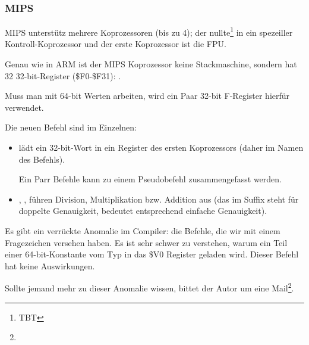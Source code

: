\subsubsection{MIPS}

MIPS unterstütz mehrere Koprozessoren (bis zu 4); der nullte\footnote{TBT} in ein spezeiller
Kontroll-Koprozessor und der erste Koprozessor ist die FPU.

Genau wie in ARM ist der MIPS Koprozessor keine Stackmaschine, sondern hat 32
32-bit-Register (\$F0-\$F31):
.

Muss man mit 64-bit \Tdouble Werten arbeiten, wird ein Paar 32-bit F-Register
hierfür verwendet.



Die neuen Befehl sind im Einzelnen:

\begin{itemize}

\item {} lädt ein 32-bit-Wort in ein Register des ersten Koprozessors
(daher  im Namen des Befehls).

Ein Parr  Befehle kann zu einem  Pseudobefehl zusammengefasst
werden.

\item {}, ,  führen Division, Multiplikation bzw.
Addition aus (das  im Suffix steht für doppelte Genauigkeit, 
bedeutet entsprechend einfache Genauigkeit).

\end{itemize}

\myindex{\CompilerAnomaly}
\label{MIPS_FPU_LUI}
Es gibt ein verrückte Anomalie im Compiler: die  Befehle, die wir mit
einem Fragezeichen versehen haben. 
Es ist sehr schwer zu verstehen, warum ein Teil einer
64-bit-Konstante vom Typ \Tdouble in das \$V0 Register geladen wird. 
Dieser Befehl hat keine Auswirkungen. 

Sollte jemand mehr zu dieser Anomalie wissen, bittet der Autor um eine
Mail\footnote{\EMAIL}.


